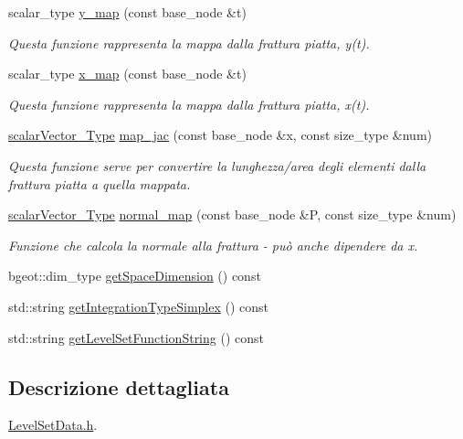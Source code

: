 \begin{DoxyCompactItemize}
scalar\-\_\-type \hyperlink{classLevelSetData_aa4cda1cced4bc385d85383b40bbc2631}{y\-\_\-map} (const base\-\_\-node \&t)
\begin{DoxyCompactList}\small\item\em Questa funzione rappresenta la mappa dalla frattura piatta, y(t). \end{DoxyCompactList}\item 
scalar\-\_\-type \hyperlink{classLevelSetData_ae7f10d3f10b72fbb6f703ba7aa8fe17b}{x\-\_\-map} (const base\-\_\-node \&t)
\begin{DoxyCompactList}\small\item\em Questa funzione rappresenta la mappa dalla frattura piatta, x(t). \end{DoxyCompactList}\item 
\hyperlink{Core_8h_a4e75b5863535ba1dd79942de2846eff0}{scalar\-Vector\-\_\-\-Type} \hyperlink{classLevelSetData_a40fcfa36de7ac76613284d03690eb54b}{map\-\_\-jac} (const base\-\_\-node \&x, const size\-\_\-type \&num)
\begin{DoxyCompactList}\small\item\em Questa funzione serve per convertire la lunghezza/area degli elementi dalla frattura piatta a quella mappata. \end{DoxyCompactList}\item 
\hyperlink{Core_8h_a4e75b5863535ba1dd79942de2846eff0}{scalar\-Vector\-\_\-\-Type} \hyperlink{classLevelSetData_a674d56690f4e22cbca38bf4b5f176a5e}{normal\-\_\-map} (const base\-\_\-node \&P, const size\-\_\-type \&num)
\begin{DoxyCompactList}\small\item\em Funzione che calcola la normale alla frattura -\/ può anche dipendere da x. \end{DoxyCompactList}\item 
bgeot\-::dim\-\_\-type \hyperlink{classLevelSetData_aa4c3e1f7876cd318e80f5052689fe9e3}{get\-Space\-Dimension} () const 
\item 
std\-::string \hyperlink{classLevelSetData_a3f8cb21a929065136dcf3a449edb373a}{get\-Integration\-Type\-Simplex} () const 
\item 
std\-::string \hyperlink{classLevelSetData_a672418971ce9b1bf71d3c6bccd278bd7}{get\-Level\-Set\-Function\-String} () const 
\end{DoxyCompactItemize}


\subsection{Descrizione dettagliata}
\hyperlink{LevelSetData_8h}{Level\-Set\-Data.\-h}. 



